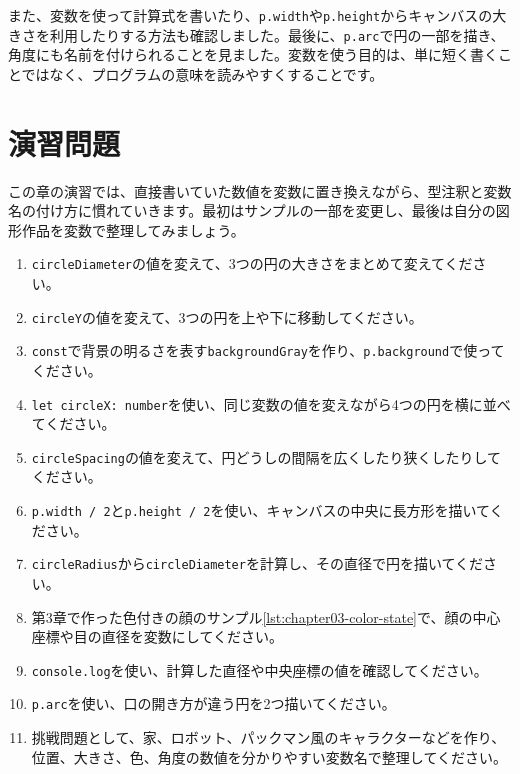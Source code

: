 また、変数を使って計算式を書いたり、\texttt{p.width}や\texttt{p.height}からキャンバスの大きさを利用したりする方法も確認しました。最後に、\texttt{p.arc}で円の一部を描き、角度にも名前を付けられることを見ました。変数を使う目的は、単に短く書くことではなく、プログラムの意味を読みやすくすることです。

\section{演習問題}

この章の演習では、直接書いていた数値を変数に置き換えながら、型注釈と変数名の付け方に慣れていきます。最初はサンプルの一部を変更し、最後は自分の図形作品を変数で整理してみましょう。

\begin{enumerate}
    \item \texttt{circleDiameter}の値を変えて、3つの円の大きさをまとめて変えてください。
    \item \texttt{circleY}の値を変えて、3つの円を上や下に移動してください。
    \item \texttt{const}で背景の明るさを表す\texttt{backgroundGray}を作り、\texttt{p.background}で使ってください。
    \item \texttt{let circleX: number}を使い、同じ変数の値を変えながら4つの円を横に並べてください。
    \item \texttt{circleSpacing}の値を変えて、円どうしの間隔を広くしたり狭くしたりしてください。
    \item \texttt{p.width / 2}と\texttt{p.height / 2}を使い、キャンバスの中央に長方形を描いてください。
    \item \texttt{circleRadius}から\texttt{circleDiameter}を計算し、その直径で円を描いてください。
    \item 第3章で作った色付きの顔のサンプル\ref{lst:chapter03-color-state}で、顔の中心座標や目の直径を変数にしてください。
    \item \texttt{console.log}を使い、計算した直径や中央座標の値を確認してください。
    \item \texttt{p.arc}を使い、口の開き方が違う円を2つ描いてください。
    \item 挑戦問題として、家、ロボット、パックマン風のキャラクターなどを作り、位置、大きさ、色、角度の数値を分かりやすい変数名で整理してください。
\end{enumerate}
